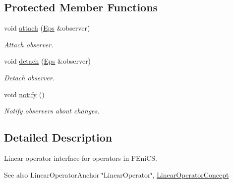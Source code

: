 \subsection*{Protected Member Functions}
\begin{DoxyCompactItemize}
\item 
\hypertarget{classSpacy_1_1Mixin_1_1MixinConnection_abb5520ee6b22dd993d78f142939a1ed4}{}void \hyperlink{classSpacy_1_1Mixin_1_1MixinConnection_abb5520ee6b22dd993d78f142939a1ed4}{attach} (\hyperlink{classSpacy_1_1Mixin_1_1Eps_a51dbe0b9cc950e0f3dfd34a481f08ae4_a51dbe0b9cc950e0f3dfd34a481f08ae4}{Eps} \&observer)\label{classSpacy_1_1Mixin_1_1MixinConnection_abb5520ee6b22dd993d78f142939a1ed4}

\begin{DoxyCompactList}\small\item\em Attach observer. \end{DoxyCompactList}\item 
\hypertarget{classSpacy_1_1Mixin_1_1MixinConnection_adda739590c487679c26f60e50aedb73f}{}void \hyperlink{classSpacy_1_1Mixin_1_1MixinConnection_adda739590c487679c26f60e50aedb73f}{detach} (\hyperlink{classSpacy_1_1Mixin_1_1Eps_a51dbe0b9cc950e0f3dfd34a481f08ae4_a51dbe0b9cc950e0f3dfd34a481f08ae4}{Eps} \&observer)\label{classSpacy_1_1Mixin_1_1MixinConnection_adda739590c487679c26f60e50aedb73f}

\begin{DoxyCompactList}\small\item\em Detach observer. \end{DoxyCompactList}\item 
\hypertarget{classSpacy_1_1Mixin_1_1MixinConnection_a1ddeaa78a3bb4a38c2cca36d1f99fe36}{}void \hyperlink{classSpacy_1_1Mixin_1_1MixinConnection_a1ddeaa78a3bb4a38c2cca36d1f99fe36}{notify} ()\label{classSpacy_1_1Mixin_1_1MixinConnection_a1ddeaa78a3bb4a38c2cca36d1f99fe36}

\begin{DoxyCompactList}\small\item\em Notify observers about changes. \end{DoxyCompactList}\end{DoxyCompactItemize}


\subsection{Detailed Description}
Linear operator interface for operators in F\+Eni\+C\+S. 

\begin{DoxySeeAlso}{See also}
Linear\+Operator\+Anchor \char`\"{}\+Linear\+Operator\char`\"{}, \hyperlink{group__ConceptGroup_gaf0e18e41c434cfceb77ccb8e785a8055_LinearOperatorConceptAnchor}{Linear\+Operator\+Concept} 
\end{DoxySeeAlso}


